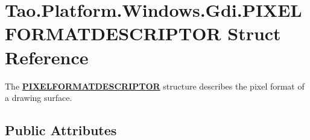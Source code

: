 \hypertarget{struct_tao_1_1_platform_1_1_windows_1_1_gdi_1_1_p_i_x_e_l_f_o_r_m_a_t_d_e_s_c_r_i_p_t_o_r}{
\section{Tao.Platform.Windows.Gdi.PIXELFORMATDESCRIPTOR Struct Reference}
\label{struct_tao_1_1_platform_1_1_windows_1_1_gdi_1_1_p_i_x_e_l_f_o_r_m_a_t_d_e_s_c_r_i_p_t_o_r}
}


The {\bfseries \hyperlink{struct_tao_1_1_platform_1_1_windows_1_1_gdi_1_1_p_i_x_e_l_f_o_r_m_a_t_d_e_s_c_r_i_p_t_o_r}{PIXELFORMATDESCRIPTOR}} structure describes the pixel format of a drawing surface.  


\subsection*{Public Attributes}
